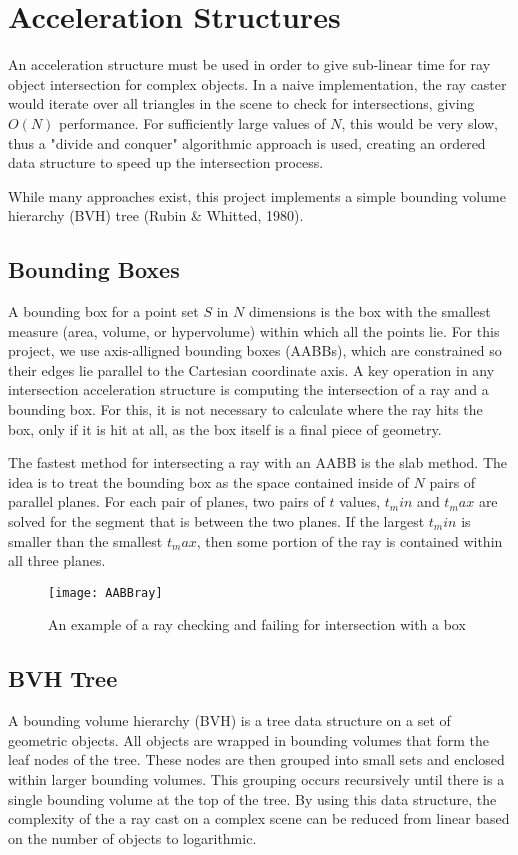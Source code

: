 \section{Acceleration Structures}

An acceleration structure must be used in order to give sub-linear time for ray object intersection for complex objects.
In a naive implementation, the ray caster would iterate over all triangles in the scene to check for intersections, giving $O(N)$ performance.
For sufficiently large values of $N$, this would be very slow, thus a "divide and conquer" algorithmic approach is used, creating an ordered data structure to speed up the intersection process.

While many approaches exist, this project implements a simple bounding volume hierarchy (BVH) tree (Rubin \& Whitted, 1980).

\subsection{Bounding Boxes}

A bounding box for a point set $S$ in $N$ dimensions is the box with the smallest measure (area, volume, or hypervolume) within which all the points lie.
For this project, we use axis-alligned bounding boxes (AABBs), which are constrained so their edges lie parallel to the Cartesian coordinate axis.
A key operation in any intersection acceleration structure is computing the intersection of a ray and a bounding box.
For this, it is not necessary to calculate where the ray hits the box, only if it is hit at all, as the box itself is a final piece of geometry.

The fastest method for intersecting a ray with an AABB is the slab method.
The idea is to treat the bounding box as the space contained inside of $N$ pairs of parallel planes.
For each pair of planes, two pairs of $t$ values, $t_min$ and $t_max$ are solved for the segment that is between the two planes.
If the largest $t_min$ is smaller than the smallest $t_max$, then some portion of the ray is contained within all three planes.

\begin{figure}
\texttt{[image: AABBray]}
\caption{An example of a ray checking and failing for intersection with a box}
\end{figure}

\subsection{BVH Tree}
 A bounding volume hierarchy (BVH) is a tree data structure on a set of geometric objects.
 All objects are wrapped in bounding volumes that form the leaf nodes of the tree.
 These nodes are then grouped into small sets and enclosed within larger bounding volumes.
 This grouping occurs recursively until there is a single bounding volume at the top of the tree.
 By using this data structure, the complexity of the a ray cast on a complex scene can be reduced from linear based on the number of objects to logarithmic.
 
